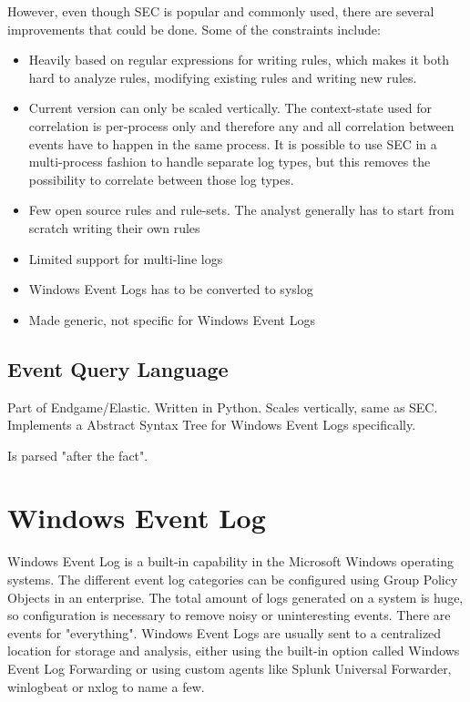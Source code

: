 However, even though SEC is popular and commonly used, there are several improvements that could be done. Some of the constraints include:
\begin{itemize}
    \item Heavily based on regular expressions for writing rules, which makes it both hard to analyze rules, modifying existing rules and writing new rules.
    \item Current version can only be scaled vertically. The context-state used for correlation is per-process only and therefore any and all correlation between events have to happen in the same process. It is possible to use SEC in a multi-process fashion to handle separate log types, but this removes the possibility to correlate between those log types. 
    \item Few open source rules and rule-sets. The analyst generally has to start from scratch writing their own rules
    \item Limited support for multi-line logs
    \item Windows Event Logs has to be converted to syslog
    \item Made generic, not specific for Windows Event Logs
\end{itemize}

\subsection{Event Query Language}
\label{sec:eql}

Part of Endgame/Elastic. Written in Python. Scales vertically, same as SEC. Implements a Abstract Syntax Tree for Windows Event Logs specifically.

Is parsed "after the fact".


\section{Windows Event Log}

Windows Event Log is a built-in capability in the Microsoft Windows operating systems. The different event log categories can be configured using Group Policy Objects in an enterprise. The total amount of logs generated on a system is huge, so configuration is necessary to remove noisy or uninteresting events.
There are events for "everything". 
Windows Event Logs are usually sent to a centralized location for storage and analysis, either using the built-in option called Windows Event Log Forwarding or using custom agents like Splunk Universal Forwarder, winlogbeat or nxlog to name a few.


